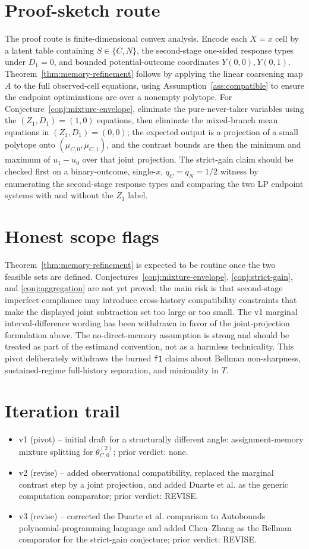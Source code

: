 \documentclass[11pt]{article}
\theoremstyle{definition}
\theoremstyle{plain}
\theoremstyle{remark}
\begin{document}
\section{Proof-sketch route}
The proof route is finite-dimensional convex analysis.  Encode each \(X=x\) cell by a latent table containing \(S\in\{C,N\}\), the second-stage one-sided response types under \(D_1=0\), and bounded potential-outcome coordinates \(Y(0,0),Y(0,1)\).  Theorem~\ref{thm:memory-refinement} follows by applying the linear coarsening map \(A\) to the full observed-cell equations, using Assumption~\ref{ass:compatible} to ensure the endpoint optimizations are over a nonempty polytope.  For Conjecture~\ref{conj:mixture-envelope}, eliminate the pure-never-taker variables using the \((Z_1,D_1)=(1,0)\) equations, then eliminate the mixed-branch mean equations in \((Z_1,D_1)=(0,0)\); the expected output is a projection of a small polytope onto \((\mu_{C,0},\mu_{C,1})\), and the contrast bounds are then the minimum and maximum of \(u_1-u_0\) over that joint projection.  The strict-gain claim should be checked first on a binary-outcome, single-\(x\), \(q_C=q_N=1/2\) witness by enumerating the second-stage response types and comparing the two LP endpoint systems with and without the \(Z_1\) label.

\section{Honest scope flags}
Theorem~\ref{thm:memory-refinement} is expected to be routine once the two feasible sets are defined.  Conjectures~\ref{conj:mixture-envelope}, \ref{conj:strict-gain}, and \ref{conj:aggregation} are not yet proved; the main risk is that second-stage imperfect compliance may introduce cross-history compatibility constraints that make the displayed joint subtraction set too large or too small.  The v1 marginal interval-difference wording has been withdrawn in favor of the joint-projection formulation above.  The no-direct-memory assumption is strong and should be treated as part of the estimand convention, not as a harmless technicality.  This pivot deliberately withdraws the burned \texttt{f1} claims about Bellman non-sharpness, sustained-regime full-history separation, and minimality in \(T\).

\section{Iteration trail}
\begin{itemize}[leftmargin=*]
\item v1 (pivot) -- initial draft for a structurally different angle: assignment-memory mixture splitting for \(\theta_{C,0}^{(2)}\); prior verdict: none.
\item v2 (revise) -- added observational compatibility, replaced the marginal contrast step by a joint projection, and added Duarte et al. as the generic computation comparator; prior verdict: REVISE.
\item v3 (revise) -- corrected the Duarte et al. comparison to Autobounds polynomial-programming language and added Chen--Zhang as the Bellman comparator for the strict-gain conjecture; prior verdict: REVISE.
\end{itemize}
\end{document}
